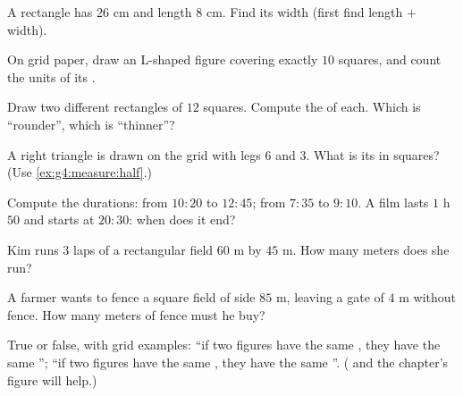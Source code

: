\begin{exercise}[$\star$]\label{exo:g4:measure:4}
A rectangle has  $26$ cm and length $8$ cm. Find its width
(first find length $+$ width).
\end{exercise}

\begin{exercise}[$\star$]\label{exo:g4:measure:5}
On grid paper, draw an L-shaped figure covering exactly $10$
squares, and count the units of its .
\end{exercise}

\begin{exercise}[$\star$]\label{exo:g4:measure:6}
Draw two different rectangles of  $12$ squares. Compute the
 of each. Which is ``rounder'', which is ``thinner''?
\end{exercise}

\begin{exercise}[$\star$]\label{exo:g4:measure:7}
A right triangle is drawn on the grid with legs $6$ and $3$. What is
its  in squares? (Use \cref{ex:g4:measure:half}.)
\end{exercise}

\begin{exercise}[$\star$]\label{exo:g4:measure:8}
Compute the durations: from $10{:}20$ to $12{:}45$; from $7{:}35$ to
$9{:}10$. A film lasts $1$ h $50$ and starts at $20{:}30$: when does
it end?
\end{exercise}

\begin{exercise}[$\star$]\label{exo:g4:measure:9}
Kim runs $3$ laps of a rectangular field $60$ m by $45$ m. How many
meters does she run?
\end{exercise}

\begin{exercise}[$\star\star$]\label{exo:g4:measure:10}
A farmer wants to fence a square field of side $85$ m, leaving a
gate of $4$ m without fence. How many meters of fence must he buy?
\end{exercise}

\begin{exercise}[$\star\star$]\label{exo:g4:measure:11}
True or false, with grid examples: ``if two figures have the same
, they have the same ''; ``if two figures have the same
, they have the same ''.
( and the chapter's figure will help.)
\end{exercise}
